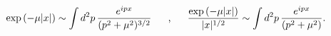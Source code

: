 \begin{equation}
\exp {(-\mu |x|)}\sim \int d^2p\,\frac{e^{ipx}}{(p^2+\mu^2)^{3/2}}
\makebox[.5in]{,}
\frac{\exp {(-\mu |x|)}}{|x|^{1/2}}
\sim \int d^2p\,\frac{ e^{ipx}}{(p^2+\mu^2)}.
\end{equation}

